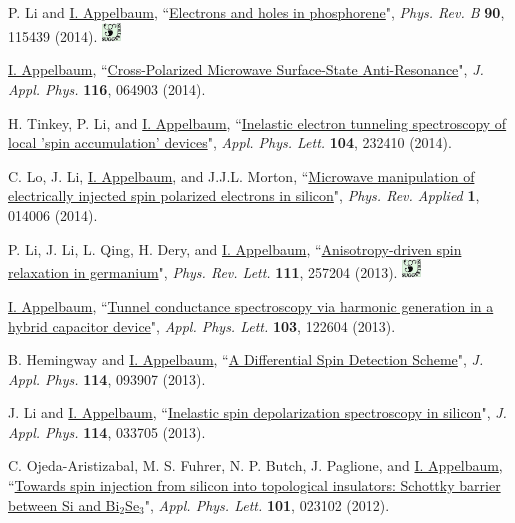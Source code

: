 \documentclass[paper=letter,fontsize=11pt]{scrartcl} %
\newcommand{\PaperEntry}[7]{
		\noindent #1, ``\href{#7}{#2}", \textit{#3} \textbf{#4}, #5 (#6).}
\begin{document}
\begin{etaremune}
\item \PaperEntry{P. Li and \underline{I. Appelbaum}}{Electrons and holes in phosphorene}{Phys. Rev. B}{90}{115439}{2014}
{http://dx.doi.org/10.1103/PhysRevB.90.115439} \includegraphics[width=0.2in]{sug.pdf} 

\item \PaperEntry{\underline{I. Appelbaum}}{Cross-Polarized Microwave Surface-State Anti-Resonance}{J. Appl. Phys.}{116}{064903}{2014}{http://dx.doi.org/10.1063/1.4892867}

\item \PaperEntry{H. Tinkey, P. Li, and \underline{I. Appelbaum}}{Inelastic electron tunneling spectroscopy of local 'spin accumulation' devices}{Appl. Phys. Lett.}{104}{232410}{2014}{http://dx.doi.org/10.1063/1.4883638}

\item \PaperEntry{C. Lo, J. Li, \underline{I. Appelbaum}, and J.J.L. Morton}{Microwave manipulation of electrically injected spin polarized electrons in silicon}{Phys. Rev. Applied}{1}{014006}{2014}{http://dx.doi.org/10.1103/PhysRevApplied.1.014006}

\item\PaperEntry
{P. Li, J. Li, L. Qing, H. Dery, and \underline{I. Appelbaum}}{Anisotropy-driven spin relaxation in germanium}{Phys. Rev. Lett.}{111}{257204}{2013}{http://dx.doi.org/10.1103/PhysRevLett.111.257204} \includegraphics[width=0.2in]{sug.pdf} 

\item\PaperEntry
{\underline{I. Appelbaum}}{Tunnel conductance spectroscopy via harmonic generation in a hybrid capacitor device}{Appl. Phys. Lett.}{103}{122604}{2013}{http://dx.doi.org/10.1063/1.4821748}

\item\PaperEntry{B. Hemingway and \underline{I. Appelbaum}}{A Differential Spin Detection Scheme}{J. Appl. Phys.}{114}{093907}{2013}{http://dx.doi.org/10.1063/1.4820467}

\item\PaperEntry{J. Li and \underline{I. Appelbaum}}{Inelastic spin depolarization spectroscopy in silicon}{J. Appl. Phys.}{114}{033705}{2013}{http://dx.doi.org/10.1063/1.4815873}

\item\PaperEntry{C. Ojeda-Aristizabal, M. S. Fuhrer, N. P. Butch, J. Paglione, and \underline{I. Appelbaum}}{Towards spin injection from silicon into topological insulators: Schottky barrier between Si and Bi$_2$Se$_3$}{Appl. Phys. Lett.}{101}{023102}{2012}{http://dx.doi.org/10.1063/1.4733388}


\end{etaremune}
\end{document}
